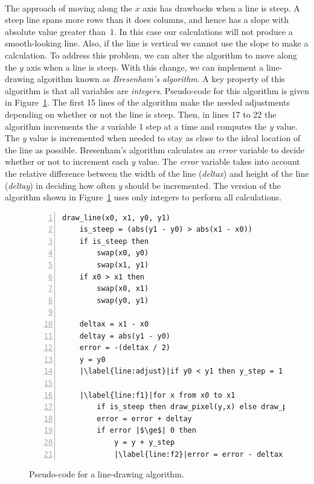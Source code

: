 \documentclass[epsfig,10pt,fullpage]{article}
\begin{document}
~\\
\noindent
The approach of moving along the $x$ axis has drawbacks when a line is steep. A steep line
spans more rows than it does columns, and hence has a slope with absolute value greater than~1.
In this case our calculations will not produce a smooth-looking line.  Also, if the line
is vertical we cannot use the slope to make a calculation.  To address this 
problem, we can alter the algorithm to move along the $y$ axis when a line is steep. With 
this change, we can implement a line-drawing algorithm known as {\it Bresenham's algorithm}.
A key property of this algorithm is that all variables are {\it integers}.
Pseudo-code for this algorithm is given in Figure~\ref{fig:bresenham}. The first 15
lines of the algorithm make the needed adjustments depending on whether or not the line is
steep. Then, in lines 17 to 22 the algorithm increments the {\it x} variable 1 step at a time
and computes the {\it y} value. The {\it y} value is incremented when needed to stay as
close to the ideal location of the line as possible. Bresenham's algorithm calculates an
{\it error} variable to decide whether or not to increment each {\it y} value. 
The {\it error} variable takes into account the relative difference
between the width of the line ({\it deltax}) and height of the line ({\it deltay}) in deciding
how often {\it y} should be incremented.  The version
of the algorithm shown in Figure~\ref{fig:bresenham} uses only integers to perform
all calculations.

\begin{figure}[h]
\begin{center}
\begin{minipage}[t]{12.5 cm}
\begin{lstlisting}[numbers=left,name=bresenham]
draw_line(x0, x1, y0, y1)
	is_steep = (abs(y1 - y0) > abs(x1 - x0))
	if is_steep then
		swap(x0, y0)
		swap(x1, y1)
	if x0 > x1 then
		swap(x0, x1)
		swap(y0, y1)

	deltax = x1 - x0
	deltay = abs(y1 - y0)
	error = -(deltax / 2)
	y = y0
	|\label{line:adjust}|if y0 < y1 then y_step = 1 else y_step = -1

	|\label{line:f1}|for x from x0 to x1
		if is_steep then draw_pixel(y,x) else draw_pixel(x,y)
		error = error + deltay
		if error |$\ge$| 0 then
			y = y + y_step
			|\label{line:f2}|error = error - deltax
\end{lstlisting}
\end{minipage}
\caption{Pseudo-code for a line-drawing algorithm.}
\label{fig:bresenham}
\end{center}
\end{figure}
\end{document}
